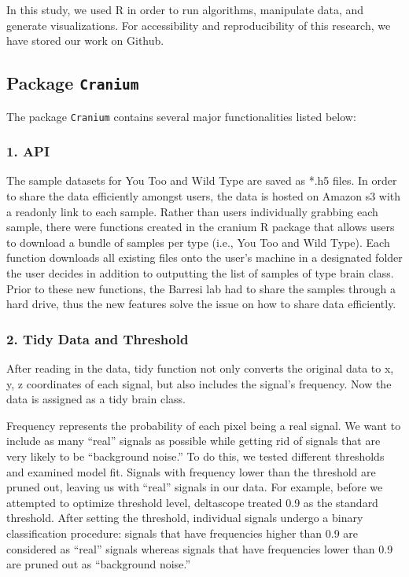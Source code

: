 \documentclass[10pt,letterpaper]{article}
\begin{document}
In this study, we used R in order to run algorithms, manipulate data,
and generate visualizations. For accessibility and reproducibility of
this research, we have stored our work on Github.

\hypertarget{package-cranium}{%
\subsection{\texorpdfstring{Package
\texttt{Cranium}}{Package Cranium}}\label{package-cranium}}

The package \texttt{Cranium} contains several major functionalities
listed below:

\hypertarget{api}{%
\subsubsection{1. API}\label{api}}

The sample datasets for You Too and Wild Type are saved as *.h5 files.
In order to share the data efficiently amongst users, the data is hosted
on Amazon s3 with a readonly link to each sample. Rather than users
individually grabbing each sample, there were functions created in the
cranium R package that allows users to download a bundle of samples per
type (i.e., You Too and Wild Type). Each function downloads all existing
files onto the user's machine in a designated folder the user decides in
addition to outputting the list of samples of type brain class. Prior to
these new functions, the Barresi lab had to share the samples through a
hard drive, thus the new features solve the issue on how to share data
efficiently.

\hypertarget{tidy-data-and-threshold}{%
\subsubsection{2. Tidy Data and
Threshold}\label{tidy-data-and-threshold}}

After reading in the data, tidy function not only converts the original
data to x, y, z coordinates of each signal, but also includes the
signal's frequency. Now the data is assigned as a tidy brain class.

Frequency represents the probability of each pixel being a real signal.
We want to include as many ``real'' signals as possible while getting
rid of signals that are very likely to be ``background noise.'' To do
this, we tested different thresholds and examined model fit. Signals
with frequency lower than the threshold are pruned out, leaving us with
``real'' signals in our data. For example, before we attempted to
optimize threshold level, deltascope treated 0.9 as the standard
threshold. After setting the threshold, individual signals undergo a
binary classification procedure: signals that have frequencies higher
than 0.9 are considered as ``real'' signals whereas signals that have
frequencies lower than 0.9 are pruned out as ``background noise.''
\end{document}

